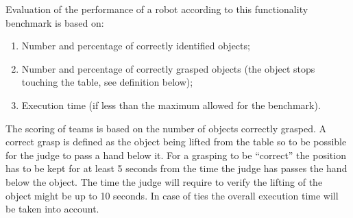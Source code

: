 Evaluation of the performance of a robot according to this functionality benchmark is based on:
%
\begin{enumerate}
\item Number and percentage of correctly identified objects;
\item Number and percentage of correctly grasped objects (the object stops touching the table, see definition below);
\item Execution time (if less than the maximum allowed for the benchmark).
\end{enumerate}
The scoring of teams is based on the number of objects correctly grasped. 
A correct grasp is defined as the object being lifted from the table so to be possible for the judge to pass a hand below it. 
For a grasping to be ``correct'' the position has to be kept for at least 5 seconds from the time the judge has passes the hand below the object. 
The time the judge will require to verify the lifting of the object might be up to 10 seconds. 
In case of ties the overall execution time will be taken into account.

